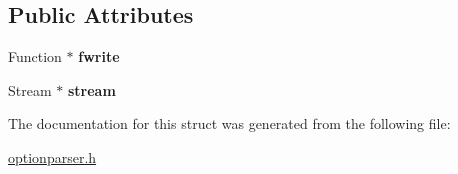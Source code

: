 \subsection*{Public Attributes}
\begin{DoxyCompactItemize}
\item 
\mbox{\label{structoption_1_1_print_usage_implementation_1_1_stream_writer_a6f54abc9a3f7f00206d87a3619713954}} 
Function $\ast$ {\bfseries fwrite}
\item 
\mbox{\label{structoption_1_1_print_usage_implementation_1_1_stream_writer_ab4bfd31b1c37376505ccd4230f7f7ad9}} 
Stream $\ast$ {\bfseries stream}
\end{DoxyCompactItemize}


The documentation for this struct was generated from the following file\+:\begin{DoxyCompactItemize}
\item 
\hyperlink{optionparser_8h}{optionparser.\+h}\end{DoxyCompactItemize}
